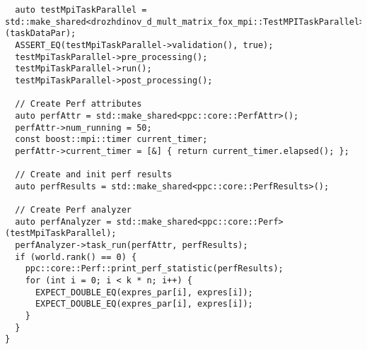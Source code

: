 \documentclass{report}
\begin{document}
\begin{lstlisting}
  auto testMpiTaskParallel = std::make_shared<drozhdinov_d_mult_matrix_fox_mpi::TestMPITaskParallel>(taskDataPar);
  ASSERT_EQ(testMpiTaskParallel->validation(), true);
  testMpiTaskParallel->pre_processing();
  testMpiTaskParallel->run();
  testMpiTaskParallel->post_processing();

  // Create Perf attributes
  auto perfAttr = std::make_shared<ppc::core::PerfAttr>();
  perfAttr->num_running = 50;
  const boost::mpi::timer current_timer;
  perfAttr->current_timer = [&] { return current_timer.elapsed(); };

  // Create and init perf results
  auto perfResults = std::make_shared<ppc::core::PerfResults>();

  // Create Perf analyzer
  auto perfAnalyzer = std::make_shared<ppc::core::Perf>(testMpiTaskParallel);
  perfAnalyzer->task_run(perfAttr, perfResults);
  if (world.rank() == 0) {
    ppc::core::Perf::print_perf_statistic(perfResults);
    for (int i = 0; i < k * n; i++) {
      EXPECT_DOUBLE_EQ(expres_par[i], expres[i]);
      EXPECT_DOUBLE_EQ(expres_par[i], expres[i]);
    }
  }
}
\end{lstlisting}
\end{document}
